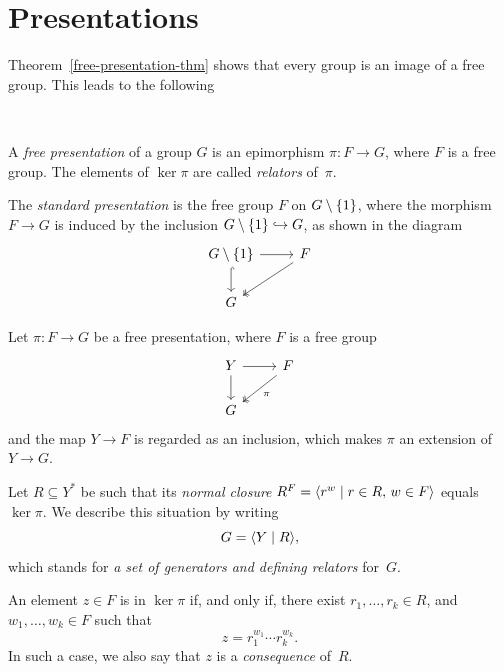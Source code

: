 \section{Presentations}\label{sec:presentations}

Theorem~\ref{free-presentation-thm} shows that every group is an image of a free group. This leads to the following

\begin{defns}\label{defn:presentations}${}$
    
    A \textsl{free presentation} of a group $G$ is an epimorphism $\pi\colon F\to G$, where $F$ is a free group. The elements of $\ker\pi$ are called \textsl{relators} of~$\pi$.

    The \textsl{standard presentation} is the free group $F$ on $G\setminus\{1\}$, where the morphism $F\to G$ is induced by the inclusion $G\setminus\{1\}\hookrightarrow G$, as shown in the diagram
    $$
        \begin{tikzcd}
            G\setminus\set1
                    \arrow[d,hook]
                    \arrow[r]
                &F
                    \arrow[ld,two heads]\\
            G
        \end{tikzcd}
    $$

    Let $\pi\colon F\to G$ be a free presentation, where $F$ is a free group
    $$
        \begin{tikzcd}
            Y
                    \arrow[d]
                    \arrow[r]
                &F
                    \arrow[ld,"\pi",two heads]\\
            G
        \end{tikzcd}
    $$
    and the map $Y\to F$ is regarded as an inclusion, which makes $\pi$ an extension of $Y\to G$.
    
    Let $R\subseteq Y^*$ be such that its \textsl{normal closure\/} $R^F=\langle r^w\mid r\in R,\,w\in F\rangle$ equals $\ker\pi$. We describe this situation by writing
    $$
        G = \langle Y\mid R\rangle,
    $$
    which stands for \textsl{a set of generators and defining relators} for~$G$. 
    
    An element $z\in F$ is in $\ker\pi$ if, and only if, there exist $r_1,\dots, r_k\in R$, and $w_1,\dots,w_k\in F$ such that
    \begin{equation}\label{eq.relator}
        z = r_1^{w_1}\cdots r_k^{w_k}.
    \end{equation}
    In such a case, we also say that $z$ is a \textsl{consequence} of~$R$.
    

\end{defns}

